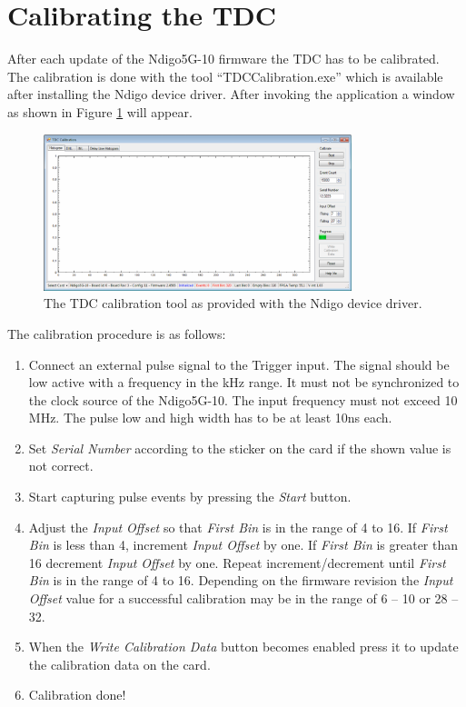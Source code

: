     \section{Calibrating the TDC}

        After each update of the Ndigo5G-10 firmware the TDC has to be calibrated. The calibration is done with the tool ``TDC\tu Calibration.exe'' which is available after installing the Ndigo device driver. After invoking the application a window as shown in Figure \ref{fig:Calib} will appear.\par

        \begin{figure}[ht]
            \begin{center}
                \includegraphics[width=0.8\textwidth]{figures/Calib.pdf}
                \caption{\label{fig:Calib}The TDC calibration tool as provided with the Ndigo device driver.}
            \end{center}
        \end{figure}

        The calibration procedure is as follows:

        \begin{enumerate}
            \item Connect an external pulse signal to the Trigger input. The signal should be low active with a frequency in the kHz range. It must not be synchronized to the clock source of the Ndigo5G-10. The input frequency must not exceed 10 MHz. The pulse low and high width has to be at least 10ns each.
            \item Set \textit{Serial Number} according to the sticker on the card if the shown value is not correct.
            \item Start capturing pulse events by pressing the \textit{Start} button.
            \item Adjust the \textit{Input Offset} so that \textit{First Bin} is in the range of 4 to 16. If \textit{First Bin} is less than 4, increment \textit{Input Offset} by one. If \textit{First Bin} is greater than 16 decrement \textit{Input Offset} by one. Repeat increment/decrement until \textit{First Bin} is in the range of 4 to 16. Depending on the firmware revision the \textit{Input Offset} value for a successful calibration may be in the range of 6 – 10 or 28 – 32.
            \item When the \textit{Write Calibration Data} button becomes enabled press it to update the calibration data on the card.
            \item Calibration done!
        \end{enumerate}

